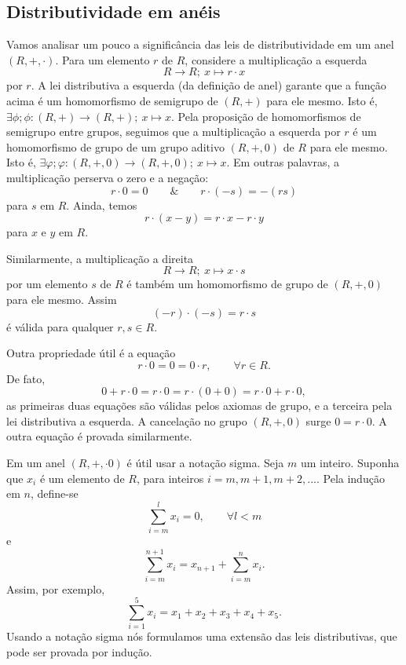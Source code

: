    \subsection{Distributividade em anéis}
      Vamos analisar um pouco a significância das leis de distributividade em um anel $(R, +, \cdot)$. 
      Para um elemento $r$ de $R$, considere a multiplicação a esquerda $$R \to R;\ x \mapsto r \cdot x$$ por $r$. A lei distributiva a esquerda (da definição de anel) garante que a função acima é um homomorfismo de semigrupo de $(R, +)$ para ele mesmo. Isto é, $\exists \phi; \phi: (R, +) \to (R, +);\ x \mapsto x$. Pela proposição de homomorfismos de semigrupo entre grupos, seguimos que a multiplicação a esquerda por $r$ é um homomorfismo de grupo de um grupo aditivo $(R,+,0)$ de $R$ para ele mesmo. Isto é, $\exists \varphi; \varphi: (R,+,0) \to (R,+,0);\ x \mapsto x$. Em outras palavras, a multiplicação perserva o zero e a negação: $$r \cdot 0 = 0\quad \quad \&\quad \quad r \cdot (-s) = -(rs)$$ para $s$ em $R$. Ainda, temos $$r \cdot (x-y) = r\cdot x - r \cdot y$$ para $x$ e $y$ em $R$.

      Similarmente, a multiplicação a direita $$R \to R;\ x \mapsto x \cdot s$$ por um elemento $s$ de $R$ é também um homomorfismo de grupo de $(R,+,0)$ para ele mesmo. Assim $$(-r) \cdot (-s) = r \cdot s$$ é válida para qualquer $r,s \in R$.

      Outra propriedade útil é a equação $$r \cdot 0 = 0 = 0 \cdot r,\quad \quad \forall r \in R.$$ De fato, $$0 + r \cdot 0 = r \cdot 0 = r \cdot (0 + 0) = r \cdot 0 + r \cdot 0,$$ as primeiras duas equações são válidas pelos axiomas de grupo, e a terceira pela lei distributiva a esquerda. A cancelação no grupo $(R,+,0)$ surge $0=r \cdot 0$. A outra equação é provada similarmente.

      Em um anel $(R,+,\cdot0)$ é útil usar a notação sigma. Seja $m$ um inteiro. Suponha que $x_{i}$ é um elemento de $R$, para inteiros $i=m, m+1 , m+2 , ...$. Pela indução em $n$, define-se $$\sum^{l}_{i=m} x_{i} = 0,\quad \quad \forall l < m$$ e $$\sum^{n+1}_{i=m} x_{i} = x_{n+1} + \sum^{n}_{i=m} x_{i}.$$ Assim, por exemplo, $$\sum^{5}_{i=1} x_{i} = x_{1} + x_{2} + x_{3} + x_{4} + x_{5}.$$ Usando a notação sigma nós formulamos uma extensão das leis distributivas, que pode ser provada por indução.

